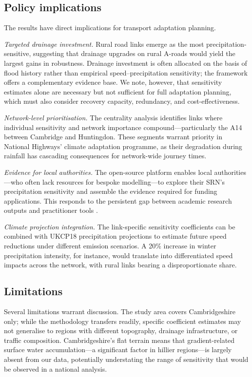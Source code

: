 \documentclass[review]{elsarticle}
\begin{document}
\subsection{Policy implications}
\label{sec:disc:policy}

The results have direct implications for transport adaptation planning.

\textit{Targeted drainage investment.} Rural road links emerge as the most precipitation-sensitive, suggesting that drainage upgrades on rural A-roads would yield the largest gains in robustness. Drainage investment is often allocated on the basis of flood history rather than empirical speed--precipitation sensitivity; the framework offers a complementary evidence base. We note, however, that sensitivity estimates alone are necessary but not sufficient for full adaptation planning, which must also consider recovery capacity, redundancy, and cost-effectiveness.

\textit{Network-level prioritisation.} The centrality analysis identifies links where individual sensitivity and network importance compound---particularly the A14 between Cambridge and Huntingdon. These segments warrant priority in National Highways' climate adaptation programme, as their degradation during rainfall has cascading consequences for network-wide journey times.

\textit{Evidence for local authorities.} The open-source platform enables local authorities---who often lack resources for bespoke modelling---to explore their SRN's precipitation sensitivity and assemble the evidence required for funding applications. This responds to the persistent gap between academic research outputs and practitioner tools \citep{unece2024stress,dft2024rea}.

\textit{Climate projection integration.} The link-specific sensitivity coefficients can be combined with UKCP18 precipitation projections \citep{ukcp18} to estimate future speed reductions under different emission scenarios. A 20\% increase in winter precipitation intensity, for instance, would translate into differentiated speed impacts across the network, with rural links bearing a disproportionate share.

\subsection{Limitations}
\label{sec:disc:limits}

Several limitations warrant discussion. The study area covers Cambridgeshire only; while the methodology transfers readily, specific coefficient estimates may not generalise to regions with different topography, drainage infrastructure, or traffic composition. Cambridgeshire's flat terrain means that gradient-related surface water accumulation---a significant factor in hillier regions---is largely absent from our data, potentially understating the range of sensitivity that would be observed in a national analysis.
\end{document}
